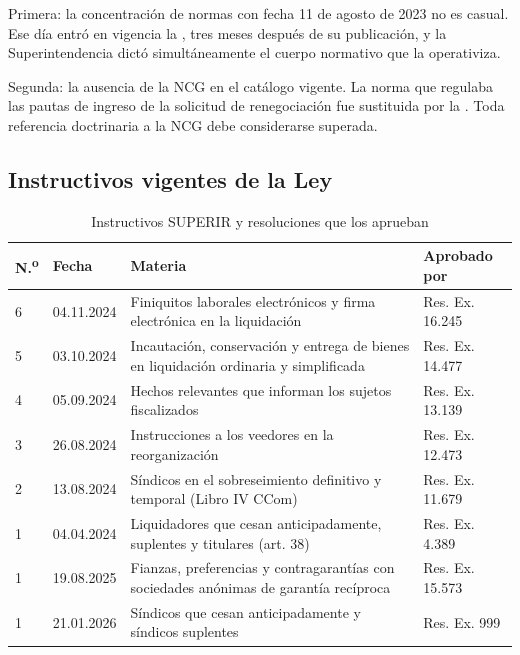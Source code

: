\begin{foco}
Primera: la concentración de normas con fecha 11 de agosto de 2023 no es casual. Ese día
entró en vigencia la \Lreforma{} \citeyearpar{ley-21563}, tres meses después de su
publicación, y la Superintendencia dictó simultáneamente el cuerpo normativo que la
operativiza.

Segunda: la ausencia de la NCG  en el catálogo vigente. La norma que regulaba las
pautas de ingreso de la solicitud de renegociación fue sustituida por la 
\citeyearpar{ncg-28}. Toda referencia doctrinaria a la NCG  debe considerarse
superada.
\end{foco}

\subsection{Instructivos vigentes de la Ley }

\begin{table}[htbp]
\centering
\small
\caption{Instructivos SUPERIR y resoluciones que los aprueban}
\label{tab:instructivos}
\begin{tabularx}{\textwidth}{@{}p{} p{} X p{}@{}}
\toprule
\textbf{N.\textsuperscript{o}} & \textbf{Fecha} & \textbf{Materia} & \textbf{Aprobado por} \\
\midrule
6 & 04.11.2024 & Finiquitos laborales electrónicos y firma electrónica en la liquidación
& Res. Ex. 16.245 \\
5 & 03.10.2024 & Incautación, conservación y entrega de bienes en liquidación ordinaria y
simplificada & Res. Ex. 14.477 \\
4 & 05.09.2024 & Hechos relevantes que informan los sujetos fiscalizados & Res. Ex. 13.139 \\
3 & 26.08.2024 & Instrucciones a los veedores en la reorganización & Res. Ex. 12.473 \\
2 & 13.08.2024 & Síndicos en el sobreseimiento definitivo y temporal (Libro IV CCom)
& Res. Ex. 11.679 \\
1 & 04.04.2024 & Liquidadores que cesan anticipadamente, suplentes y titulares (art. 38)
& Res. Ex. 4.389 \\
1 & 19.08.2025 & Fianzas, preferencias y contragarantías con sociedades anónimas de
garantía recíproca & Res. Ex. 15.573 \\
1 & 21.01.2026 & Síndicos que cesan anticipadamente y síndicos suplentes & Res. Ex. 999 \\
\bottomrule
\end{tabularx}
\end{table}

